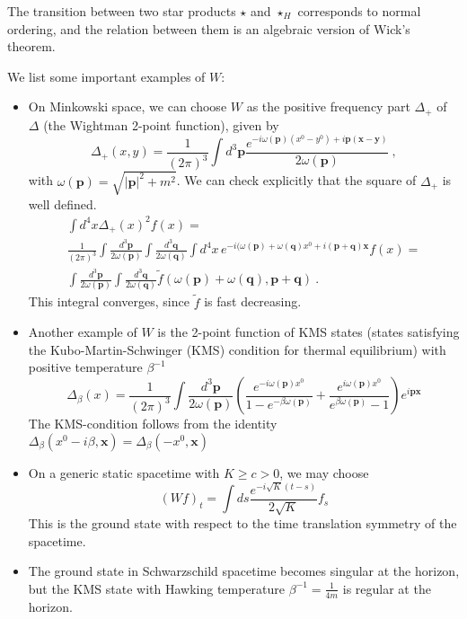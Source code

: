 \documentclass[12pt]{article}
\newcommand{\1}{\mathds{1}}                         %
\begin{document}
{{The transition between two star products $\star$ and $\star_H$ corresponds to normal ordering, and the relation between them is an algebraic version of Wick's theorem. 
\begin{exa}
We list some important examples of $W$:
\begin{itemize}
\item On Minkowski space, we can choose $W$ as the positive frequency part $\Delta_+$ of $\Delta$ (the Wightman 2-point function), given by
\[\Delta_+(x,y)=\frac{1}{(2\pi)^{3}}\int d^3\mathbf p\frac{e^{-i\omega(\mathbf p)(x^0-y^0)+i\mathbf p(\mathbf x-\mathbf y)}}{2\omega(\mathbf p)}\ ,\]
with $\omega(\mathbf p)=\sqrt{|\mathbf p|^2+m^2}$.
We can check explicitly that the square of $\Delta_+$ is well defined.
\begin{multline*}
\int d^4x \Delta_+(x)^2f(x)=\\
\frac{1}{(2\pi)^{3}}\int \frac{d^3\mathbf p}{2\omega(\mathbf p)}\int \frac{d^3{\mathbf q}}{2\omega(\mathbf q)}\int d^4x\, e^{-i(\omega(\mathbf p)+\omega(\mathbf q)x^0+i(\mathbf p+\mathbf q)\mathbf x}f(x)=\\
 \int \frac{d^3\mathbf p}{2\omega(\mathbf p)}\int \frac{d^3{\mathbf q}}{2\omega(\mathbf q)}\tilde f(\omega(\mathbf p)+\omega(\mathbf q),\mathbf p+\mathbf q)\ .
\end{multline*}
This integral converges, since $\tilde f$ is fast decreasing.
\item Another example of $W$ is the 2-point function of KMS states (states satisfying the Kubo-Martin-Schwinger (KMS) condition for
thermal equilibrium) with positive temperature $\beta^{-1}$
\[
\Delta_\beta(x)=\frac{1}{(2\pi)^{3}}\int \frac{d^3\mathbf p}{2\omega(\mathbf p)}\left(\frac{e^{-i\omega(\mathbf p)x^0}}{1-e^{-\beta\omega(\mathbf p)}}+\frac{e^{i\omega(\mathbf p)x^0}}{e^{\beta\omega(\mathbf p)}-1}\right)e^{i\mathbf p\mathbf x}
\]
The KMS-condition follows from the identity $\Delta_\beta(x^0-i\beta,\mathbf x)=\Delta_\beta(-x^0,\mathbf x)$
\item On a generic static spacetime with $K\ge c>0$, we may choose
\[(Wf)_t=\int ds \frac{e^{-i\sqrt{K}(t-s)}}{2\sqrt{K}}f_s\]
This is the ground state with respect to the time translation symmetry of the spacetime. 
\item The ground state in Schwarzschild spacetime becomes singular at the horizon, but the KMS state with Hawking temperature $\beta^{-1}=\frac{1}{4m}$ is regular at the horizon.
\end{itemize}
 \end{exa}
 
}}
\end{document}
